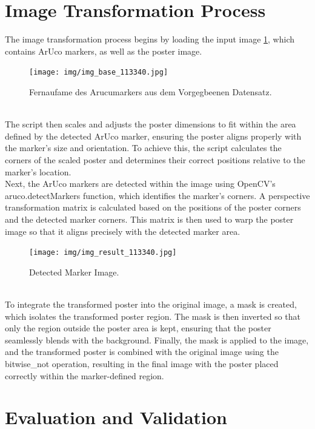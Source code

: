 \documentclass[a4paper,twocolumn]{article}
\begin{document}
\section{Image Transformation Process}
The image transformation process begins by loading the input image \ref{fig:example-base}, which contains ArUco markers, as well as the poster image. 
\begin{figure}[h!]
    \centering
    \texttt{[image: img/img\_base\_113340.jpg]} %
    \caption{Fernaufame des Arucumarkers aus dem Vorgegbeenen Datensatz.}
    \label{fig:example-base}
\end{figure}
\\
The script then scales and adjusts the poster dimensions to fit within the area defined by the detected ArUco marker, ensuring the poster aligns properly with the marker's size and orientation. To achieve this, the script calculates the corners of the scaled poster and determines their correct positions relative to the marker's location. 
\\
Next, the ArUco markers are detected within the image using OpenCV's aruco.detectMarkers function, which identifies the marker's corners. A perspective transformation matrix is calculated based on the positions of the poster corners and the detected marker corners. This matrix is then used to warp the poster image so that it aligns precisely with the detected marker area.
\begin{figure}[h!]
    \centering
    \texttt{[image: img/img\_result\_113340.jpg]} %
    \caption{Detected Marker Image.}
    \label{fig:example-result}
\end{figure}
\\
To integrate the transformed poster into the original image, a mask is created, which isolates the transformed poster region. The mask is then inverted so that only the region outside the poster area is kept, ensuring that the poster seamlessly blends with the background. Finally, the mask is applied to the image, and the transformed poster is combined with the original image using the bitwise_not operation, resulting in the final image with the poster placed correctly within the marker-defined region.

\section{Evaluation and Validation}
\end{document}
